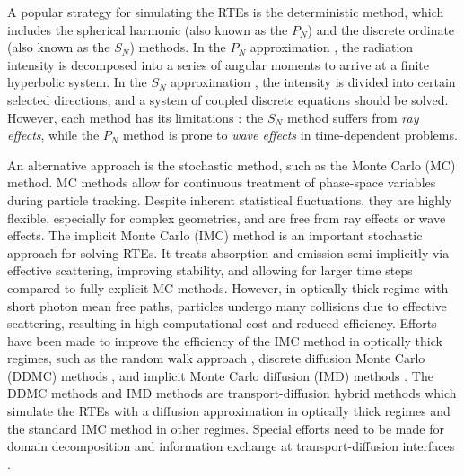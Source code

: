 \documentclass[preprint,12pt]{elsarticle}
\theoremstyle{definition}
\theoremstyle{plain}
\numberwithin{equation}{section}
\numberwithin{algorithm}{section}
\newcounter{eq_count}
\newcounter{tab_count}
\begin{document}
A popular strategy for simulating the RTEs is the deterministic method, which includes the spherical harmonic (also known as the $P_N$) and the discrete ordinate (also known as the $S_N$) methods. In the $P_N$ approximation \cite{pomraning2005equations,reed1972spherical,mcclarren2008solutions,mcclarren2010robust}, the radiation intensity is decomposed into a series of angular moments to arrive at a finite hyperbolic system. In the $S_N$ approximation \cite{pomraning2005equations,reed1972spherical,adams1997subcell,sun2015asymptoticB,xiong2022high}, the intensity is divided into certain selected directions, and a system of coupled discrete equations should be solved.  However, each method has its limitations \cite{brunner2002forms}: the $S_N$ method suffers from \textit{ray effects}, while the $P_N$ method is prone to \textit{wave effects} in time-dependent problems. 

An alternative approach is the stochastic method, such as the Monte Carlo (MC) method. MC methods allow for continuous treatment of phase-space variables during particle tracking. Despite inherent statistical fluctuations, they are highly flexible, especially for complex geometries, and are free from ray effects or wave effects. The implicit Monte Carlo (IMC)  method \cite{fleck1971implicit} is an important stochastic approach for solving RTEs. 
 It treats absorption and emission semi-implicitly via effective scattering, improving stability, and allowing for larger time steps compared to fully explicit MC methods. However, in optically thick regime with short photon mean free paths, particles undergo many collisions due to effective scattering, resulting in high computational cost and reduced efficiency.  Efforts have been made to improve the efficiency of the IMC method in optically thick regimes, such as the random walk approach \cite{fleck1984random,giorla1987random,keady2017improved:}, discrete diffusion Monte Carlo (DDMC) methods 
 \cite{densmore2007hybrid,densmore2012hybrid:},
 and implicit Monte Carlo diffusion (IMD) methods \cite{cleveland2010extension,gentile2001implicit,cleveland2014mitigating}. The DDMC methods and IMD methods are transport-diffusion hybrid methods which simulate the RTEs with a diffusion approximation in optically thick regimes and the standard IMC method in other regimes. Special efforts need to be made for domain decomposition and information exchange at transport-diffusion interfaces \cite{densmore2006interface}.
\end{document}
